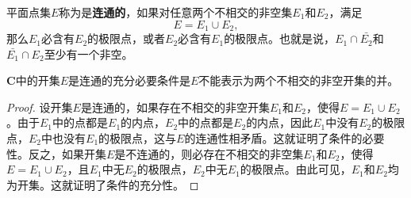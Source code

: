 \documentclass[../../main.tex]{subfiles}
\begin{document}
\begin{definition}
平面点集\(E\)称为是\textbf{连通的}，如果对任意两个不相交的非空集\(E_1\)和\(E_2\)，满足
\[
E = E_1 \cup E_2,
\]
那么\(E_1\)必含有\(E_2\)的极限点，或者\(E_2\)必含有\(E_1\)的极限点。也就是说，\(E_1 \cap \bar{E_2}\)和\(\bar{E_1} \cap E_2\)至少有一个非空。
\end{definition}

\begin{proposition}\label{proposition:集合连通的条件}
\(\mathbf{C}\)中的开集\(E\)是连通的充分必要条件是\(E\)不能表示为两个不相交的非空开集的并。
\end{proposition}
\begin{proof}
设开集\(E\)是连通的，如果存在不相交的非空开集\(E_1\)和\(E_2\)，使得\(E = E_1 \cup E_2\)。由于\(E_1\)中的点都是\(E_1\)的内点，\(E_2\)中的点都是\(E_2\)的内点，因此\(E_1\)中没有\(E_2\)的极限点，\(E_2\)中也没有\(E_1\)的极限点，这与\(E\)的连通性相矛盾。这就证明了条件的必要性。反之，如果开集\(E\)是不连通的，则必存在不相交的非空集\(E_1\)和\(E_2\)，使得\(E = E_1 \cup E_2\)，且\(E_1\)中无\(E_2\)的极限点，\(E_2\)中无\(E_1\)的极限点。由此可见，\(E_1\)和\(E_2\)均为开集。这就证明了条件的充分性。 

\end{proof}
\end{document}
